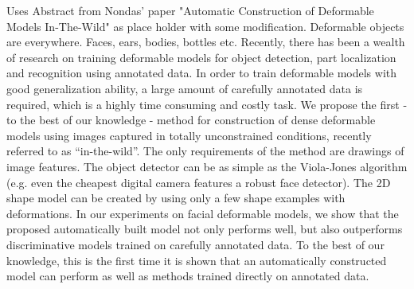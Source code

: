 Uses Abstract from Nondas' paper "Automatic Construction of Deformable Models In-The-Wild" as place holder with some modification. 
Deformable objects are everywhere. Faces, ears, bodies,
bottles etc. Recently, there has been a wealth of research
on training deformable models for object detection,
part localization and recognition using annotated data. In
order to train deformable models with good generalization
ability, a large amount of carefully annotated data is required,
which is a highly time consuming and costly task.
We propose the first - to the best of our knowledge - method
for construction of dense deformable models using images
captured in totally unconstrained conditions, recently
referred to as “in-the-wild”. The only requirements of the
method are drawings of image features. The object detector can be as simple as the
Viola-Jones algorithm (e.g. even the cheapest digital camera
features a robust face detector). The 2D shape model
can be created by using only a few shape examples with deformations.
In our experiments on facial deformable models,
we show that the proposed automatically built model
not only performs well, but also outperforms discriminative
models trained on carefully annotated data. To the best of
our knowledge, this is the first time it is shown that an automatically
constructed model can perform as well as methods
trained directly on annotated data.